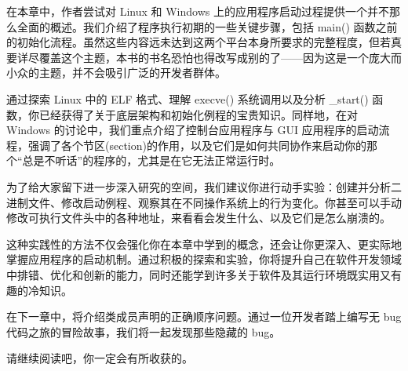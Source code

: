 在本章中，作者尝试对 Linux 和 Windows 上的应用程序启动过程提供一个并不那么全面的概述。我们介绍了程序执行初期的一些关键步骤，包括 main() 函数之前的初始化流程。虽然这些内容远未达到这两个平台本身所要求的完整程度，但若真要详尽覆盖这个主题，本书的书名恐怕也得改写成别的了——因为这是一个庞大而小众的主题，并不会吸引广泛的开发者群体。

通过探索 Linux 中的 ELF 格式、理解 execve() 系统调用以及分析 \_start() 函数，你已经获得了关于底层架构和初始化例程的宝贵知识。同样地，在对 Windows 的讨论中，我们重点介绍了控制台应用程序与 GUI 应用程序的启动流程，强调了各个节区(section)的作用，以及它们是如何共同协作来启动你的那个“总是不听话”的程序的，尤其是在它无法正常运行时。

为了给大家留下进一步深入研究的空间，我们建议你进行动手实验：创建并分析二进制文件、修改启动例程、观察其在不同操作系统上的行为变化。你甚至可以手动修改可执行文件头中的各种地址，来看看会发生什么、以及它们是怎么崩溃的。

这种实践性的方法不仅会强化你在本章中学到的概念，还会让你更深入、更实际地掌握应用程序的启动机制。通过积极的探索和实验，你将提升自己在软件开发领域中排错、优化和创新的能力，同时还能学到许多关于软件及其运行环境既实用又有趣的冷知识。

在下一章中，将介绍类成员声明的正确顺序问题。通过一位开发者踏上编写无 bug 代码之旅的冒险故事，我们将一起发现那些隐藏的 bug。

请继续阅读吧，你一定会有所收获的。